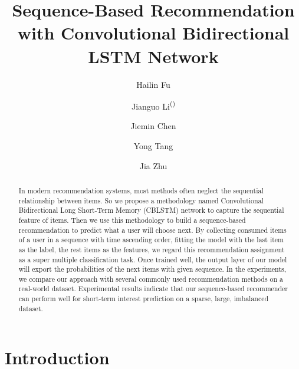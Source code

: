 \documentclass[runningheads]{llncs}
\begin{document}
%
\title{Sequence-Based Recommendation with Convolutional Bidirectional LSTM Network}
%
%
\author{Hailin Fu \and Jianguo Li\textsuperscript{(\Letter)} \and Jiemin Chen \and Yong Tang \and Jia Zhu}
%
%
%
\maketitle              %
%
\begin{abstract}
In modern recommendation systems, most methods often neglect the sequential relationship between items. So we propose a methodology named Convolutional Bidirectional Long Short-Term Memory (CBLSTM) network to capture the sequential feature of items. Then we use this methodology to build a sequence-based recommendation to predict what a user will choose next. By collecting consumed items of a user in a sequence with time ascending order, fitting the model with the last item as the label, the rest items as the features, we regard this recommendation assignment as a super multiple classification task. Once trained well, the output layer of our model will export the probabilities of the next items with given sequence. In the experiments, we compare our approach with several commonly used recommendation methods on a real-world dataset. Experimental results indicate that our sequence-based recommender can perform well for short-term interest prediction on a sparse, large, imbalanced dataset.

\end{abstract}
% 
%
%
\section{Introduction}
\end{document}
